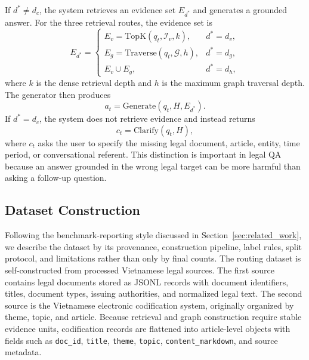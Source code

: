 \documentclass[11pt,twocolumn]{article}
\begin{document}
If $d^*\neq d_c$, the system retrieves an evidence set
$E_{d^*}$ and generates a grounded answer. For the three
retrieval routes, the evidence set is
\begin{equation}
E_{d^*}=\begin{cases}
E_v=\mathrm{TopK}(q_t,\mathcal{I}_v,k), & d^*=d_v,\\
E_g=\mathrm{Traverse}(q_t,\mathcal{G},h), & d^*=d_g,\\
E_v\cup E_g, & d^*=d_h,
\end{cases}
\label{eq:evidence_set}
\end{equation}
where $k$ is the dense retrieval depth and $h$ is the maximum
graph traversal depth. The generator then produces
\begin{equation}
a_t=\mathrm{Generate}(q_t,H,E_{d^*}).
\label{eq:answer_generation}
\end{equation}
If $d^*=d_c$, the system does not retrieve evidence and
instead returns
\begin{equation}
c_t=\mathrm{Clarify}(q_t,H),
\label{eq:clarification_generation}
\end{equation}
where $c_t$ asks the user to specify the missing legal
document, article, entity, time period, or conversational
referent. This distinction is important in legal QA because
an answer grounded in the wrong legal target can be more
harmful than asking a follow-up question.

\subsection{Dataset Construction}
\label{subsec:dataset_description}

Following the benchmark-reporting style discussed in
Section~\ref{sec:related_work}, we describe the dataset by
its provenance, construction pipeline, label rules, split
protocol, and limitations rather than only by final counts.
The routing dataset is self-constructed from processed
Vietnamese legal sources. The first source contains legal
documents stored as JSONL records with document identifiers,
titles, document types, issuing authorities, and normalized
legal text. The second source is the Vietnamese electronic
codification system, originally organized by theme, topic,
and article. Because retrieval and graph construction require
stable evidence units, codification records are flattened
into article-level objects with fields such as
\texttt{doc\_id}, \texttt{title}, \texttt{theme},
\texttt{topic}, \texttt{content\_markdown}, and source
metadata.
\end{document}
